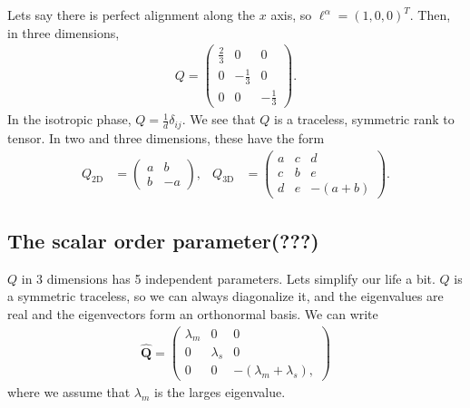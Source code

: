 Lets say there is perfect alignment along the $x$ axis, so $\ell^\alpha = (1, 0, 0)^T$.
Then, in three dimensions,
%
\begin{align}
    Q = 
    \begin{pmatrix}
        \frac{2}{3} & 0 & 0 \\
        0 & -\frac{1}{3} & 0 \\
        0 &0 & -\frac{1}{3}
    \end{pmatrix}.
\end{align}
%
In the isotropic phase, $Q = \frac{1}{d}\delta_{ij}$.
We see that $Q$ is a traceless, symmetric rank to tensor.
In two and three dimensions, these have the form
%
\begin{align}
    Q_{2\mathrm{D}} &= 
    \begin{pmatrix}
        a & b \\ b & -a
    \end{pmatrix}, &
    Q_{3\mathrm{D}} &= 
    \begin{pmatrix}
        a & c & d \\ c & b & e \\ d & e & - (a + b)
    \end{pmatrix}.
\end{align}
%


\subsection*{The scalar order parameter(???)}


$Q$ in 3 dimensions has 5 independent parameters.
Lets simplify our life a bit.
$Q$ is a symmetric traceless, so we can always diagonalize it, and the eigenvalues are real and the eigenvectors form an orthonormal basis.
We can write
%
\begin{align}
    \hat {\bm Q} = 
    \begin{pmatrix}
        \lambda_m & 0 & 0 \\ 0 & \lambda_s & 0 \\ 0 & 0 & - (\lambda_m + \lambda_s),
    \end{pmatrix}
\end{align}
%
where we assume that $\lambda_m$ is the larges eigenvalue. 

